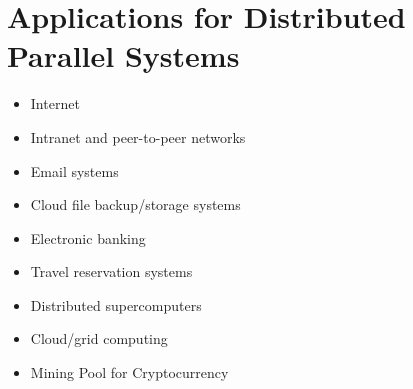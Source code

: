 \section{Applications for Distributed Parallel Systems}
\begin{itemize}
    \item Internet
    \item Intranet and peer-to-peer networks
    \item Email systems
    \item Cloud file backup/storage systems
    \item Electronic banking
    \item Travel reservation systems
    \item Distributed supercomputers
    \item Cloud/grid computing
    \item Mining Pool for Cryptocurrency
\end{itemize}
